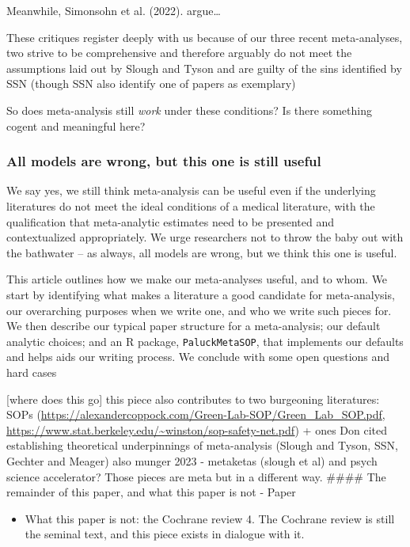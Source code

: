 \documentclass[
  man]{apa6}
\providecommand{\tightlist}{%
  \setlength{\itemsep}{0pt}\setlength{\parskip}{0pt}}
\begin{document}
Meanwhile, Simonsohn et al. (2022). argue\ldots{}

These critiques register deeply with us because of our three recent meta-analyses, two strive to be comprehensive and therefore arguably do not meet the assumptions laid out by Slough and Tyson and are guilty of the sins identified by SSN (though SSN also identify one of papers as exemplary)

So does meta-analysis still \emph{work} under these conditions? Is there something cogent and meaningful here?

\subsubsection{All models are wrong, but this one is still useful}\label{all-models-are-wrong-but-this-one-is-still-useful}

We say yes, we still think meta-analysis can be useful even if the underlying literatures do not meet the ideal conditions of a medical literature, with the qualification that meta-analytic estimates need to be presented and contextualized appropriately. We urge researchers not to throw the baby out with the bathwater -- as always, all models are wrong, but we think this one is useful.

This article outlines how we make our meta-analyses useful, and to whom. We start by identifying what makes a literature a good candidate for meta-analysis, our overarching purposes when we write one, and who we write such pieces for. We then describe our typical paper structure for a meta-analysis; our default analytic choices; and an R package, \texttt{PaluckMetaSOP}, that implements our defaults and helps aids our writing process. We conclude with some open questions and hard cases

{[}where does this go{]} this piece also contributes to two burgeoning literatures:
SOPs (\url{https://alexandercoppock.com/Green-Lab-SOP/Green_Lab_SOP.pdf}, \url{https://www.stat.berkeley.edu/~winston/sop-safety-net.pdf}) + ones Don cited
establishing theoretical underpinnings of meta-analysis (Slough and Tyson, SSN, Gechter and Meager)
also munger 2023
- metaketas (slough et al) and psych science accelerator? Those pieces are meta but in a different way.
\#\#\#\# The remainder of this paper, and what this paper is not
- Paper

\begin{itemize}
\tightlist
\item
  What this paper is not: the Cochrane review
  4. The Cochrane review is still the seminal text, and this piece exists in dialogue with it.
\end{itemize}
\end{document}

